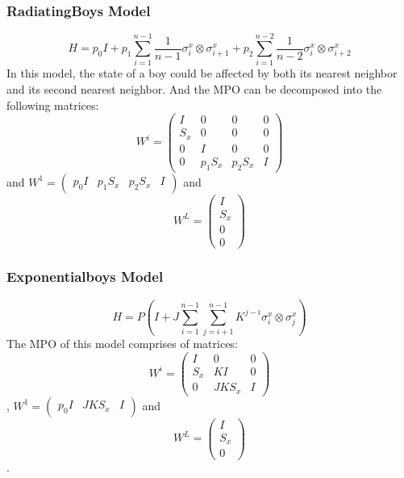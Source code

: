 \documentclass[english]{article}
\begin{document}
\subsubsection{RadiatingBoys Model}
\begin{displaymath}
H=p_0 I + p_1 \sum_{i=1}^{n-1}\frac{1}{n-1}\sigma_i^x\otimes\sigma_{i+1}^x + p_2 \sum_{i=1}^{n-2}\frac{1}{n-2}\sigma_i^x\otimes\sigma_{i+2}^x
\end{displaymath}
In this model, the state of a boy could be affected by both its nearest neighbor and its second nearest neighbor. And the MPO can be decomposed into the following matrices:
$$
W^{i}=
\begin{pmatrix}
I & 0 & 0 & 0 \\
S_x & 0 & 0 & 0 \\
0 & I & 0 & 0 \\
0 & p_1 S_x & p_2 S_x & I
\end{pmatrix}
$$
and $W^1=\begin{pmatrix}p_0 I & p_1 S_x & p_2 S_x & I\end{pmatrix}$ and 
$$W^L=
\begin{pmatrix}
I \\ S_x \\ 0 \\0
\end{pmatrix}$$


\subsubsection{Exponentialboys Model}
\begin{displaymath}
H = P (I + J \sum_{i=1}^{n-1} \sum_{j=i+1}^{n-1} K^{j-i}\sigma_i^x\otimes\sigma_j^x)
\end{displaymath}
The MPO of this model comprises of matrices:
$$W^{i}=
\begin{pmatrix}
I & 0 & 0 \\
S_x & K I & 0 \\
0 & J K S_x & I
\end{pmatrix}
$$,
$W^1=\begin{pmatrix}p_0 I & J K S_x & I\end{pmatrix}$ and 
$$W^L=
\begin{pmatrix}
I \\ S_x \\0
\end{pmatrix}$$.
\end{document}
